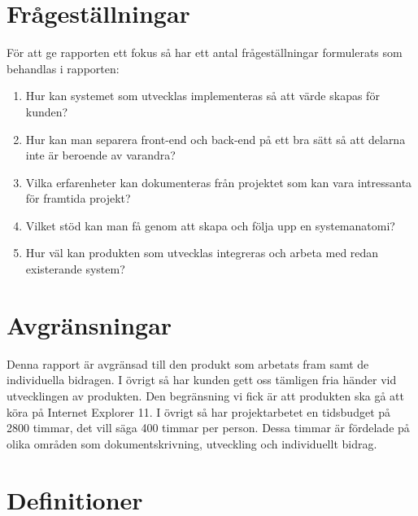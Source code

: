 \section{Frågeställningar}
För att ge rapporten ett fokus så har ett antal frågeställningar formulerats som behandlas i rapporten:
\begin{enumerate}
	\item Hur kan systemet som utvecklas implementeras så att värde skapas för kunden?
	\item Hur kan man separera front-end och back-end på ett bra sätt så att delarna inte är beroende av varandra?
	\item Vilka erfarenheter kan dokumenteras från projektet som kan vara intressanta för framtida projekt?
	\item Vilket stöd kan man få genom att skapa och följa upp en systemanatomi?
	\item Hur väl kan produkten som utvecklas integreras och arbeta med redan existerande system? 
\end{enumerate}

\section{Avgränsningar}
Denna rapport är avgränsad till den produkt som arbetats fram samt de individuella bidragen. I övrigt så har kunden gett oss tämligen fria händer vid utvecklingen av produkten. Den begränsning vi fick är att produkten ska gå att köra på Internet Explorer 11.
I övrigt så har projektarbetet en tidsbudget på 2800 timmar, det vill säga 400 timmar per person. Dessa timmar är fördelade på olika områden som dokumentskrivning, utveckling och individuellt bidrag.

\section{Definitioner}

